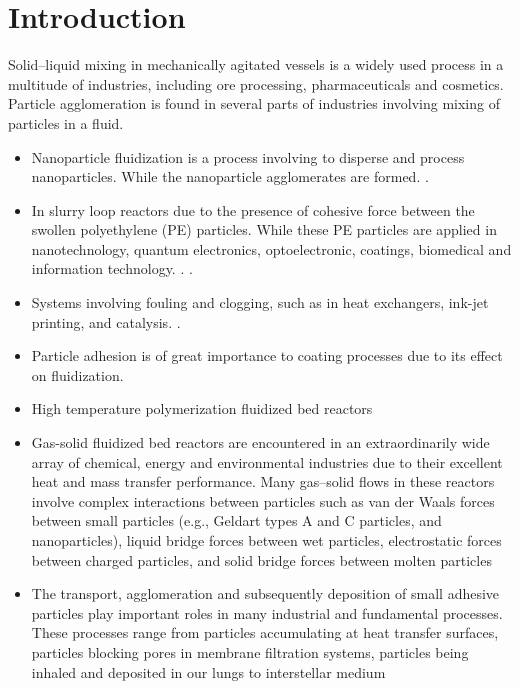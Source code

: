 \documentclass[preprint,12pt]{elsarticle}
\begin{document}


\FloatBarrier%
\section{Introduction}

Solid–liquid mixing in mechanically agitated vessels is a widely used process
in a multitude of industries, including ore processing, pharmaceuticals and
cosmetics.  Particle agglomeration is found in several parts of industries
involving mixing of particles in a fluid.
\begin{itemize}
\item Nanoparticle fluidization is a process involving to disperse and process
  nanoparticles.  While the nanoparticle agglomerates are
  formed. \cite{liu2016adhesive}.
\item In slurry loop reactors due to the presence of cohesive force between
  the swollen polyethylene (PE) particles. While these PE particles are
  applied in nanotechnology, quantum electronics, optoelectronic, coatings,
  biomedical and information technology. \cite{lu2019experiments}.
  .
\item Systems involving fouling and clogging, such as in heat exchangers,
  ink-jet printing, and catalysis. \cite{trofa2019cfd}.
\item Particle adhesion is of great importance to coating processes due to its
  effect on fluidization.
\item High temperature polymerization fluidized bed reactors
\item Gas-solid fluidized bed reactors are encountered in an extraordinarily
  wide array of chemical, energy and environmental industries due to their
  excellent heat and mass transfer performance. Many gas–solid flows in these
  reactors involve complex interactions between particles such as van der
  Waals forces between small particles (e.g., Geldart types A and C particles,
  and nanoparticles), liquid bridge forces between wet particles,
  electrostatic forces between charged particles, and solid bridge forces
  between molten particles
\item The transport, agglomeration and subsequently deposition of small
  adhesive particles play important roles in many industrial and fundamental
  processes. These processes range from particles accumulating at heat
  transfer surfaces, particles blocking pores in membrane filtration systems,
  particles being inhaled and deposited in our lungs to interstellar medium

\end{itemize}
\end{document}
